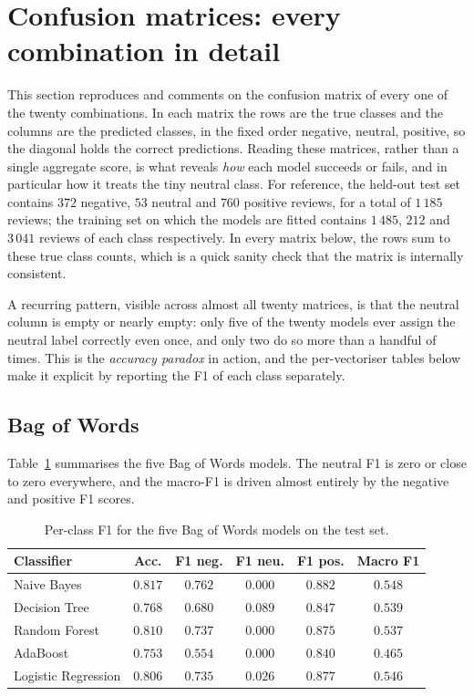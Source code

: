 \documentclass[11pt,a4paper]{article}
\begin{document}
\section{Confusion matrices: every combination in detail}
\label{sec:matrices}
This section reproduces and comments on the confusion matrix of every one of the twenty
combinations. In each matrix the rows are the true classes and the columns are the
predicted classes, in the fixed order negative, neutral, positive, so the diagonal holds
the correct predictions. Reading these matrices, rather than a single aggregate score,
is what reveals \emph{how} each model succeeds or fails, and in particular how it treats
the tiny neutral class. For reference, the held-out test set contains $372$ negative,
$53$ neutral and $760$ positive reviews, for a total of $1\,185$ reviews; the training
set on which the models are fitted contains $1\,485$, $212$ and $3\,041$ reviews of each
class respectively. In every matrix below, the rows sum to these true class counts,
which is a quick sanity check that the matrix is internally consistent.

A recurring pattern, visible across almost all twenty matrices, is that the neutral
column is empty or nearly empty: only five of the twenty models ever assign the neutral
label correctly even once, and only two do so more than a handful of times. This is the
\emph{accuracy paradox} in action, and the per-vectoriser tables below make it explicit
by reporting the F1 of each class separately.

\subsection{Bag of Words}
Table~\ref{tab:bow} summarises the five Bag of Words models. The neutral F1 is zero or
close to zero everywhere, and the macro-F1 is driven almost entirely by the negative and
positive F1 scores.

\begin{table}[H]
\centering
\begin{tabular}{lccccc}
\toprule
\textbf{Classifier} & \textbf{Acc.} & \textbf{F1 neg.} & \textbf{F1 neu.} & \textbf{F1 pos.} & \textbf{Macro F1} \\
\midrule
Naive Bayes & $0.817$ & $0.762$ & $0.000$ & $0.882$ & $0.548$ \\
Decision Tree & $0.768$ & $0.680$ & $0.089$ & $0.847$ & $0.539$ \\
Random Forest & $0.810$ & $0.737$ & $0.000$ & $0.875$ & $0.537$ \\
AdaBoost & $0.753$ & $0.554$ & $0.000$ & $0.840$ & $0.465$ \\
Logistic Regression & $0.806$ & $0.735$ & $0.026$ & $0.877$ & $0.546$ \\
\bottomrule
\end{tabular}
\caption{Per-class F1 for the five Bag of Words models on the test set.}
\label{tab:bow}
\end{table}
\end{document}

